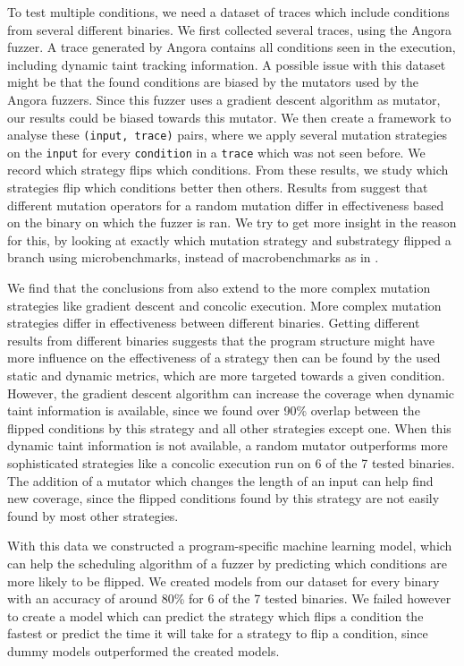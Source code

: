 To test multiple conditions, we need a dataset of traces which include conditions from several different binaries.
We first collected several traces, using the Angora fuzzer. A trace generated by Angora contains all conditions seen in the execution, including dynamic taint tracking information. A possible issue with this dataset might be that the found conditions are biased by the mutators used by the Angora fuzzers. Since this fuzzer uses a gradient descent algorithm as mutator, our results could be biased towards this mutator. We then create a framework to analyse these \texttt{(input, trace)} pairs, where we apply several mutation strategies on the \texttt{input} for every \texttt{condition} in a \texttt{trace} which was not seen before. We record which strategy flips which conditions. From these results, we study which strategies flip which conditions better then others. Results from \cite{lyu2019mopt} suggest that different mutation operators for a random mutation differ in effectiveness based on the binary on which the fuzzer is ran. We try to get more insight in the reason for this, by looking at exactly which mutation strategy and substrategy flipped a branch using microbenchmarks, instead of macrobenchmarks as in \cite{klees2018evaluating}.

We find that the conclusions from \cite{lyu2019mopt} also extend to the more complex mutation strategies like gradient descent and concolic execution. More complex mutation strategies differ in effectiveness between different binaries. 
Getting different results from different binaries suggests that the program structure might have more influence on the effectiveness of a strategy then can be found by the used static and dynamic metrics, which are more targeted towards a given condition. However, the gradient descent algorithm can increase the coverage when dynamic taint information is available, since we found over 90\% overlap between the flipped conditions by this strategy and all other strategies except one. When this dynamic taint information is not available, a random mutator outperforms more sophisticated strategies like a concolic execution run on 6 of the 7 tested binaries. The addition of a mutator which changes the length of an input can help find new coverage, since the flipped conditions found by this strategy are not easily found by most other strategies.

With this data we constructed a program-specific machine learning model, which can help the scheduling algorithm of a fuzzer by predicting which conditions are more likely to be flipped. We created models from our dataset for every binary with an accuracy of around 80\% for 6 of the 7 tested binaries.
We failed however to create a model which can predict the strategy which flips a condition the fastest or predict the time it will take for a strategy to flip a condition, since dummy models outperformed the created models.

